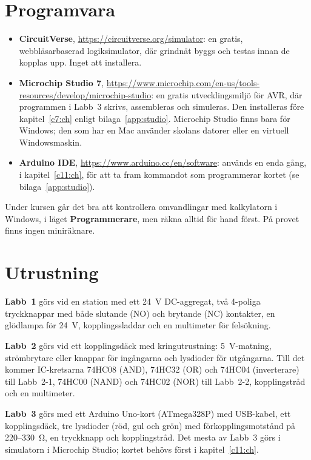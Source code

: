 \section*{Programvara}
\begin{itemize}
  \item \textbf{CircuitVerse}, \url{https://circuitverse.org/simulator}: en gratis,
    webbläsarbaserad logiksimulator, där grindnät byggs och testas innan de kopplas upp. Inget att
    installera.
  \item \textbf{Microchip Studio 7}, \url{https://www.microchip.com/en-us/tools-resources/develop/microchip-studio}:
    en gratis utvecklingsmiljö för AVR, där programmen i Labb~3 skrivs, assembleras och simuleras.
    Den installeras före kapitel~\ref{c7:ch} enligt bilaga~\ref{app:studio}. Microchip Studio finns
    bara för Windows; den som har en Mac använder skolans datorer eller en virtuell
    Windowsmaskin.
  \item \textbf{Arduino IDE}, \url{https://www.arduino.cc/en/software}: används en enda gång, i
    kapitel~\ref{c11:ch}, för att ta fram kommandot som programmerar kortet (se
    bilaga~\ref{app:studio}).
\end{itemize}
Under kursen går det bra att kontrollera omvandlingar med kalkylatorn i Windows, i läget
\textbf{Programmerare}, men räkna alltid för hand först. På provet finns ingen miniräknare.

\section*{Utrustning}
\textbf{Labb~1} görs vid en station med ett 24~V DC-aggregat, två 4-poliga tryckknappar med både
slutande (NO) och brytande (NC) kontakter, en glödlampa för 24~V, kopplingssladdar och en
multimeter för felsökning.

\textbf{Labb~2} görs vid ett kopplingsdäck med kringutrustning: 5~V-matning, strömbrytare eller
knappar för ingångarna och lysdioder för utgångarna. Till det kommer IC-kretsarna 74HC08 (AND),
74HC32 (OR) och 74HC04 (inverterare) till Labb~2-1, 74HC00 (NAND) och 74HC02 (NOR) till Labb~2-2,
kopplingstråd och en multimeter.

\textbf{Labb~3} görs med ett Arduino Uno-kort (ATmega328P) med USB-kabel, ett kopplingsdäck, tre
lysdioder (röd, gul och grön) med förkopplingsmotstånd på 220--330~Ω, en tryckknapp och
kopplingstråd. Det mesta av Labb~3 görs i simulatorn i Microchip Studio; kortet behövs först i
kapitel~\ref{c11:ch}.

